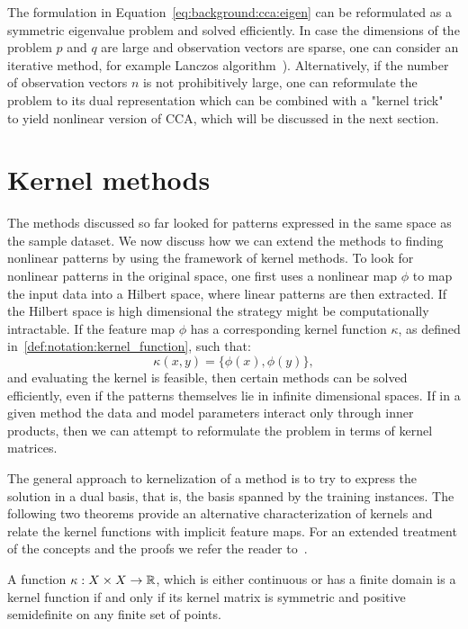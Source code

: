 The formulation in Equation~\ref{eq:background:cca:eigen} can be reformulated as a symmetric eigenvalue problem and solved efficiently. In case the dimensions of the problem $p$ and $q$ are large and observation vectors are sparse, one can consider an iterative method, for example Lanczos algorithm~\cite{LAL}). Alternatively, if the number of observation vectors $n$ is not prohibitively large, one can reformulate the problem to its dual representation which can be combined with a "kernel trick"~\cite{FBMJ} to yield nonlinear version of CCA, which will be discussed in the next section.

\section{Kernel methods}\label{chap:background:kernels}
The methods discussed so far looked for patterns expressed in the same space as the sample dataset. We now discuss how we can extend the methods to finding nonlinear patterns by using the framework of kernel methods.
To look for nonlinear patterns in the original space, one first uses a nonlinear map $\phi$ to map the input data into a Hilbert space, where linear patterns are then extracted. If the Hilbert space is high dimensional the strategy might be computationally intractable. If the feature map $\phi$ has a corresponding kernel function $\kappa$, as defined in~\ref{def:notation:kernel_function}, such that:
$$ \kappa(x,y) = \lbrace \phi(x), \phi(y) \rbrace,$$ and evaluating the kernel is feasible, then certain methods can be solved efficiently, even
if the patterns themselves lie in infinite dimensional spaces. If in a given method the data and model parameters interact only through inner products, then
we can attempt to reformulate the problem in terms of kernel matrices.

The general approach to kernelization of a method is to try to express the solution in a dual basis, that is, the basis spanned by the training instances.
The following two theorems provide an alternative characterization of kernels and relate the kernel functions with implicit feature maps. For an extended
treatment of the concepts and the proofs we refer the reader to~\cite{shawe-taylor04kernel}.

\begin{theorem}\label{thm:background:kernel_function}
A function $\kappa: X \times X \rightarrow \mathbb{R}$, which is either continuous or has a finite domain
is a kernel function if and only if its kernel matrix is symmetric and positive semidefinite on any finite set of points.
\end{theorem}

